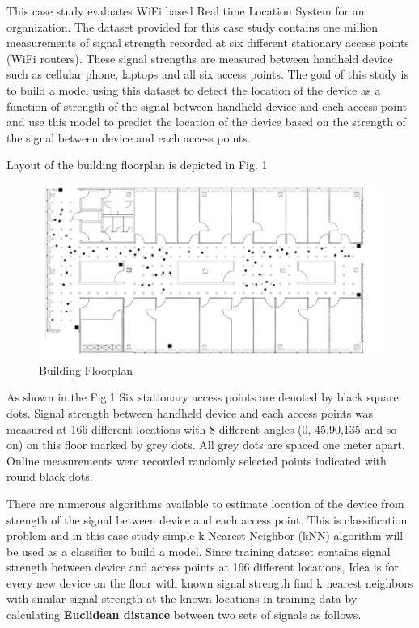 \documentclass[
]{article}
\begin{document}
This case study evaluates WiFi based Real time Location System for an
organization. The dataset provided for this case study contains one
million measurements of signal strength recorded at six different
stationary access points (WiFi routers). These signal strengths are
measured between handheld device such as cellular phone, laptops and all
six access points. The goal of this study is to build a model using this
dataset to detect the location of the device as a function of strength
of the signal between handheld device and each access point and use this
model to predict the location of the device based on the strength of the
signal between device and each access points.

Layout of the building floorplan is depicted in Fig. 1

\begin{figure}[H]

{\centering \includegraphics[width=0.5\linewidth,height=0.5\textheight,]{images/Picture1} 

}

\caption{Building Floorplan}\label{fig:unnamed-chunk-2}
\end{figure}

As shown in the Fig.1 Six stationary access points are denoted by black
square dots. Signal strength between handheld device and each access
points was measured at 166 different locations with 8 different angles
(0, 45,90,135 and so on) on this floor marked by grey dots. All grey
dots are spaced one meter apart. Online measurements were recorded
randomly selected points indicated with round black dots.

There are numerous algorithms available to estimate location of the
device from strength of the signal between device and each access point.
This is classification problem and in this case study simple k-Nearest
Neighbor (kNN) algorithm will be used as a classifier to build a model.
Since training dataset contains signal strength between device and
access points at 166 different locations, Idea is for every new device
on the floor with known signal strength find k nearest neighbors with
similar signal strength at the known locations in training data by
calculating \textbf{Euclidean distance} between two sets of signals as
follows.
\end{document}
